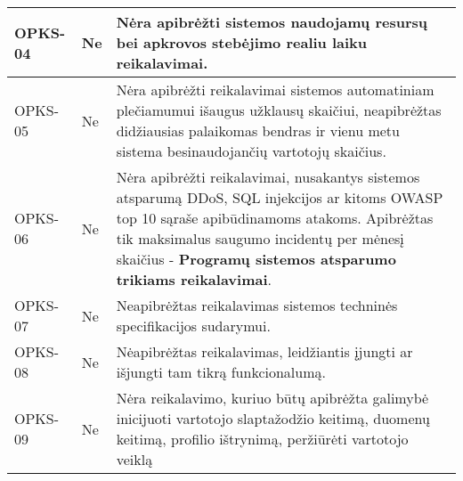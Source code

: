 \documentclass{VUMIFPSkursinis}
\begin{document}
\begin{center}
\begin{longtable}{|C{2cm}|L{2.5cm}|L{10cm}|}
		OPKS-04                                         &
		Ne                                              &
		Nėra apibrėžti sistemos naudojamų resursų bei apkrovos stebėjimo realiu laiku reikalavimai.                                                                                                                                                                        \\ \hline
		OPKS-05                                         &
		Ne                                              &
		Nėra apibrėžti reikalavimai sistemos automatiniam plečiamumui išaugus užklausų skaičiui, neapibrėžtas didžiausias palaikomas bendras ir vienu metu sistema besinaudojančių vartotojų skaičius.                                                                     \\ \hline
		OPKS-06                                         &
		Ne                                              &
		Nėra apibrėžti reikalavimai, nusakantys sistemos atsparumą DDoS, SQL injekcijos ar kitoms OWASP top 10 sąraše apibūdinamoms atakoms. Apibrėžtas tik maksimalus saugumo incidentų per mėnesį skaičius - \textbf{Programų sistemos atsparumo trikiams reikalavimai}. \\ \hline
		OPKS-07                                         &
		Ne                                              &
		Neapibrėžtas reikalavimas sistemos techninės specifikacijos sudarymui.                                                                                                                                                                                             \\ \hline
		OPKS-08                                         &
		Ne                                              &
		Nėapibrėžtas reikalavimas, leidžiantis įjungti ar išjungti tam tikrą funkcionalumą.                                                                                                                                                                                \\ \hline
		OPKS-09                                         &
		Ne                                              &
		Nėra reikalavimo, kuriuo būtų apibrėžta galimybė inicijuoti vartotojo slaptažodžio keitimą, duomenų keitimą, profilio ištrynimą, peržiūrėti vartotojo veiklą                                                                                                       \\ \hline
	\end{longtable}
\end{center}
\end{document}
